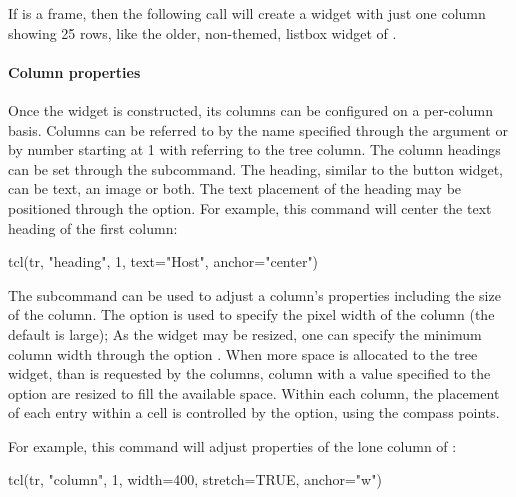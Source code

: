 If  is a frame, then the following call will create a widget with just one column showing 25 rows, like the older, non-themed, listbox widget of \Tk.

\begin{Schunk}
\end{Schunk}

\paragraph{Column properties}
Once the widget is constructed, its columns can be configured on a
per-column basis. Columns can be referred to by the name specified
through the  argument or by number starting at 1 with
 referring to the tree column. The column headings can be
set through the  subcommand. The
heading, similar to the button widget, can be text, an image or
both. The text placement of the heading may be positioned through the
 option. For example, this command will center the text
heading of the first column:
\begin{Schunk}
\begin{Sinput}
 tcl(tr, "heading", 1, text="Host", anchor="center")
\end{Sinput}
\end{Schunk}

The  subcommand can be used to adjust
a column's properties including the size of the column. The option
 is used to specify the pixel width of the column (the
default is large); As the widget may be resized, one can specify the
minimum column width through the option . When more
space is allocated to the tree widget, than is requested by the
columns, column with a  value specified to the option
 are resized to fill the available space. Within each
column, the placement of each entry within a cell is controlled by the
 option, using the compass points.

For example, this command will adjust properties of the lone column of :
\begin{Schunk}
\begin{Sinput}
 tcl(tr, "column", 1, width=400,  stretch=TRUE, anchor="w")
\end{Sinput}
\end{Schunk}

